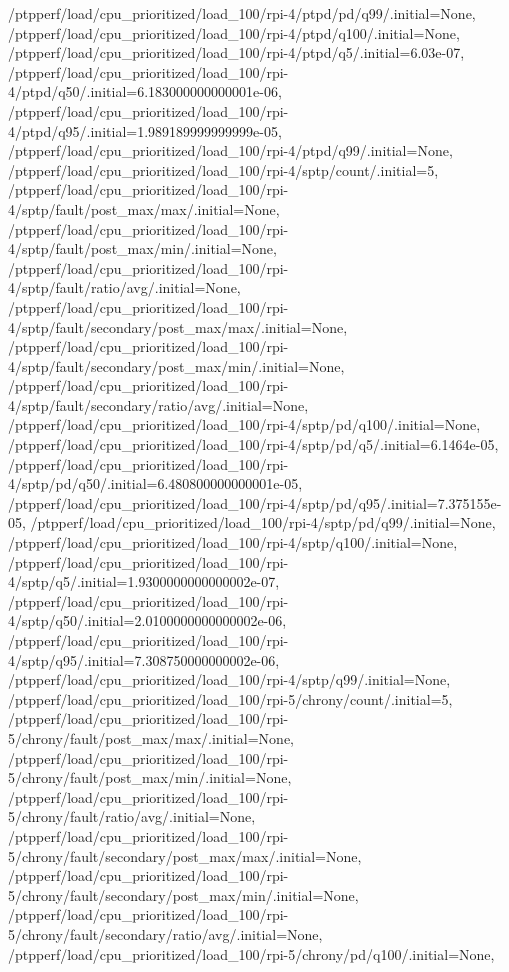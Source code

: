 {    /ptpperf/load/cpu_prioritized/load_100/rpi-4/ptpd/pd/q99/.initial=None,
    /ptpperf/load/cpu_prioritized/load_100/rpi-4/ptpd/q100/.initial=None,
    /ptpperf/load/cpu_prioritized/load_100/rpi-4/ptpd/q5/.initial=6.03e-07,
    /ptpperf/load/cpu_prioritized/load_100/rpi-4/ptpd/q50/.initial=6.183000000000001e-06,
    /ptpperf/load/cpu_prioritized/load_100/rpi-4/ptpd/q95/.initial=1.989189999999999e-05,
    /ptpperf/load/cpu_prioritized/load_100/rpi-4/ptpd/q99/.initial=None,
    /ptpperf/load/cpu_prioritized/load_100/rpi-4/sptp/count/.initial=5,
    /ptpperf/load/cpu_prioritized/load_100/rpi-4/sptp/fault/post_max/max/.initial=None,
    /ptpperf/load/cpu_prioritized/load_100/rpi-4/sptp/fault/post_max/min/.initial=None,
    /ptpperf/load/cpu_prioritized/load_100/rpi-4/sptp/fault/ratio/avg/.initial=None,
    /ptpperf/load/cpu_prioritized/load_100/rpi-4/sptp/fault/secondary/post_max/max/.initial=None,
    /ptpperf/load/cpu_prioritized/load_100/rpi-4/sptp/fault/secondary/post_max/min/.initial=None,
    /ptpperf/load/cpu_prioritized/load_100/rpi-4/sptp/fault/secondary/ratio/avg/.initial=None,
    /ptpperf/load/cpu_prioritized/load_100/rpi-4/sptp/pd/q100/.initial=None,
    /ptpperf/load/cpu_prioritized/load_100/rpi-4/sptp/pd/q5/.initial=6.1464e-05,
    /ptpperf/load/cpu_prioritized/load_100/rpi-4/sptp/pd/q50/.initial=6.480800000000001e-05,
    /ptpperf/load/cpu_prioritized/load_100/rpi-4/sptp/pd/q95/.initial=7.375155e-05,
    /ptpperf/load/cpu_prioritized/load_100/rpi-4/sptp/pd/q99/.initial=None,
    /ptpperf/load/cpu_prioritized/load_100/rpi-4/sptp/q100/.initial=None,
    /ptpperf/load/cpu_prioritized/load_100/rpi-4/sptp/q5/.initial=1.9300000000000002e-07,
    /ptpperf/load/cpu_prioritized/load_100/rpi-4/sptp/q50/.initial=2.0100000000000002e-06,
    /ptpperf/load/cpu_prioritized/load_100/rpi-4/sptp/q95/.initial=7.308750000000002e-06,
    /ptpperf/load/cpu_prioritized/load_100/rpi-4/sptp/q99/.initial=None,
    /ptpperf/load/cpu_prioritized/load_100/rpi-5/chrony/count/.initial=5,
    /ptpperf/load/cpu_prioritized/load_100/rpi-5/chrony/fault/post_max/max/.initial=None,
    /ptpperf/load/cpu_prioritized/load_100/rpi-5/chrony/fault/post_max/min/.initial=None,
    /ptpperf/load/cpu_prioritized/load_100/rpi-5/chrony/fault/ratio/avg/.initial=None,
    /ptpperf/load/cpu_prioritized/load_100/rpi-5/chrony/fault/secondary/post_max/max/.initial=None,
    /ptpperf/load/cpu_prioritized/load_100/rpi-5/chrony/fault/secondary/post_max/min/.initial=None,
    /ptpperf/load/cpu_prioritized/load_100/rpi-5/chrony/fault/secondary/ratio/avg/.initial=None,
    /ptpperf/load/cpu_prioritized/load_100/rpi-5/chrony/pd/q100/.initial=None,
}

